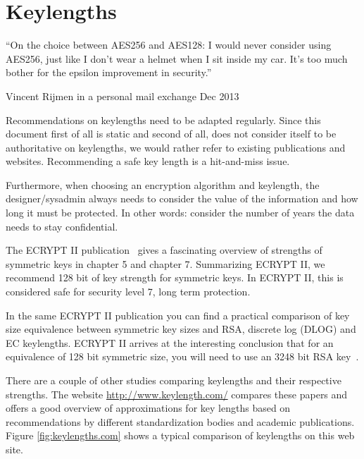 \section{Keylengths}
\label{section:keylengths}


\epigraph{``On the choice between AES256 and AES128: I would never consider
using AES256, just like I don't wear a helmet when I sit inside my car. It's
too much bother for the epsilon improvement in security.''}{Vincent Rijmen
in a personal mail exchange Dec 2013}

Recommendations on keylengths need to be adapted regularly. Since this document
first of all is static and second of all, does not consider itself to be
authoritative on keylengths, we would rather refer to existing publications and
websites.  Recommending a safe key length is a hit-and-miss issue.

Furthermore, when choosing an encryption algorithm and keylength, the
designer/sysadmin always needs to consider the value of the information and how
long it must be protected.  In other words: consider the number of years the
data needs to stay confidential.


The ECRYPT II publication~\cite{ii2011ecrypt} gives a fascinating overview of
strengths of symmetric keys in chapter 5 and chapter 7. Summarizing ECRYPT II, we
recommend 128 bit of key strength for symmetric keys. In ECRYPT II, this is
considered safe for security level 7, long term protection.

In the same ECRYPT II publication you can find a practical comparison of key size
equivalence between symmetric key sizes and RSA, discrete log (DLOG) and EC
keylengths. ECRYPT II arrives at the interesting conclusion that for an
equivalence of 128 bit symmetric size, you will need to use an 3248 bit RSA
key~\cite[chapter 7, page 30]{ii2011ecrypt}.


There are a couple of other studies comparing keylengths and their respective
strengths.  The website \url{http://www.keylength.com/} compares these papers
and offers a good overview of approximations for key lengths based on
recommendations by different standardization bodies and academic publications.
Figure \ref{fig:keylengths.com} shows a typical comparison of keylengths on
this web site.

